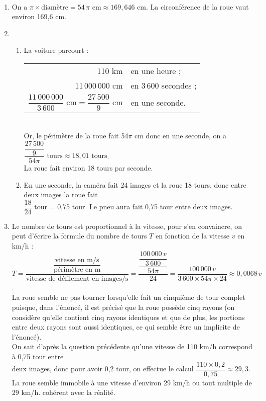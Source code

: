 \ \\ [-5mm]
\begin{enumerate}
   \item On a $\pi\times\text{diamètre} =54\,\pi\text{ cm} \approx169,646\text{ cm}$. {\blue La circonférence de la roue vaut environ 169,6 cm.}
   \item
      \begin{enumerate}
         \item La voiture parcourt :
            {
            \begin{tabular}[t]{rl}
               110 km & en une heure ; \\
               11\,000\,000 cm & en 3\,600 secondes ; \\ [1mm]
               $\dfrac{11\,000\,000}{3\,600}\text{ cm} =\dfrac{27\,500}{9}\text{ cm}$ & en une seconde. \\
            \end{tabular}} \\
            Or, le périmètre de la roue fait 54$\pi$ cm donc en une seconde, on a $\dfrac{\dfrac{27\,500}{9}}{54\pi}\text{ tours} \approx18,01\text{ tours}$. \\
            {\blue La roue fait environ 18 tours par seconde.}
         \item En une seconde, la caméra fait 24 images et la roue 18 tours, donc entre deux images la roue fait \\
            $\dfrac{18}{24}$ tour = 0,75 tour. {\blue Le pneu aura fait 0,75 tour entre deux images.} \smallskip
      \end{enumerate}
   \setcounter{enumi}{1}
   \item Le nombre de tours est proportionnel à la vitesse, pour s'en convaincre, on peut d'écrire la formule du nombre de tours $T$ en fonction de la vitesse $v$ en km/h : \\ [1mm]
      $T =\dfrac{\dfrac{\text{vitesse en m/s}}{\text{périmètre en m}}}{\text{vitesse de défilement en images/s}} =\dfrac{\dfrac{\dfrac{100\,000\,v}{3\,600}}{54\pi}}{24} =\dfrac{100\,000\,v}{3\,600\times54\pi\times24} \approx 0,0068\,v$. \\ [2mm]
      La roue semble ne pas tourner lorsqu'elle fait un cinquième de tour complet puisque, dans l'énoncé, il est précisé que la roue possède cinq rayons (on considère qu'elle contient cinq rayons identiques et que de plus, les portions entre deux rayons sont aussi identiques, ce qui semble être un implicite de l'énoncé). \\
      On sait d'après la question précédente qu'une vitesse de 110 km/h correspond à 0,75 tour entre \\ [1mm] deux images, donc pour avoir 0,2 tour, on effectue le calcul $\dfrac{110\times0,2}{0,75} \approx29,3$. \\
      {\blue La roue semble immobile à une vitesse d'environ 29 km/h ou tout multiple de 29 km/h. cohérent avec la réalité.}
   \end{enumerate}
